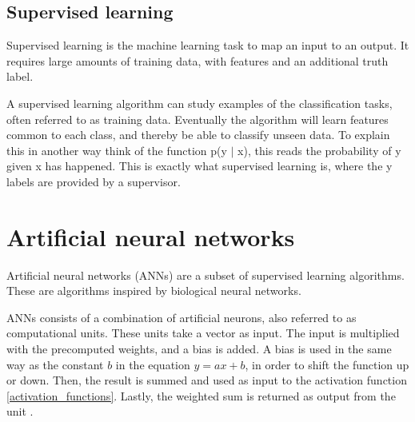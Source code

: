 \subsection{Supervised learning}
\label{supervised_learning}

Supervised learning is the machine learning task to map an input to an output. It requires large amounts of training data, with features and an additional truth label.

A supervised learning algorithm can study examples of the classification tasks, often referred to as training data. Eventually the algorithm will learn features common to each class, and thereby be able to classify unseen data. To explain this in another way think of the function p(y $|$ x), this reads the probability of y given x has happened. This is exactly what supervised learning is, where the y labels are provided by a supervisor.

\section{Artificial neural networks}
\label{artificial_neural_networks}

Artificial neural networks (ANNs) are a subset of supervised learning algorithms. These are algorithms inspired by biological neural networks.

ANNs consists of a combination of artificial neurons, also referred to as computational units. These units take a vector as input. The input is multiplied with the precomputed weights, and a bias is added. A bias is used in the same way as the constant $b$ in the equation $y = ax + b$, in order to shift the function up or down. Then, the result is summed and used as input to the activation function \ref{activation_functions}. Lastly, the weighted sum is returned as output from the unit \cite{_cs231n_????} \cite{_multi-layer_????}.

